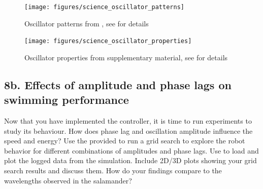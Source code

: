 \documentclass{cmc}
\begin{document}
\begin{figure}[H]
  \centering
  \texttt{[image: figures/science\_oscillator\_patterns]}
  \caption{Oscillator patterns from \cite{ijspeert2007swimming}, see
    \cite{ijspeert2007swimming} for details}
  \label{fig:science_oscillator_patterns}
\end{figure}

\begin{figure}[H]
  \centering
  \texttt{[image: figures/science\_oscillator\_properties]}
  \caption{Oscillator properties from \cite{ijspeert2007swimming} supplementary
    material, see \cite{ijspeert2007swimming} for details}
  \label{fig:science_oscillator_properties}
\end{figure}



\subsection*{8b. Effects of amplitude and phase lags on swimming
  performance}
\label{sec:amplitude-phase-performance}

Now that you have implemented the controller, it is time to run experiments to
study its behaviour. How does phase lag and oscillation amplitude influence the
speed and energy? Use the provided  to run a grid search
to explore the robot behavior for different combinations of amplitudes and phase
lags. Use  to load and plot the logged data from the
simulation. Include 2D/3D plots showing your grid search results and discuss
them. How do your findings compare to the wavelengths observed in the
salamander?

\end{document}
